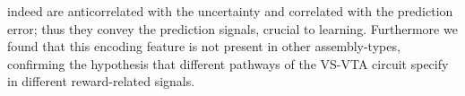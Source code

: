 indeed are anticorrelated with the uncertainty and correlated with the prediction error; thus they convey the prediction signals, crucial to learning. Furthermore we found that this encoding feature is not present in other assembly-types, confirming the hypothesis that different pathways of the VS-VTA circuit specify in different reward-related signals.